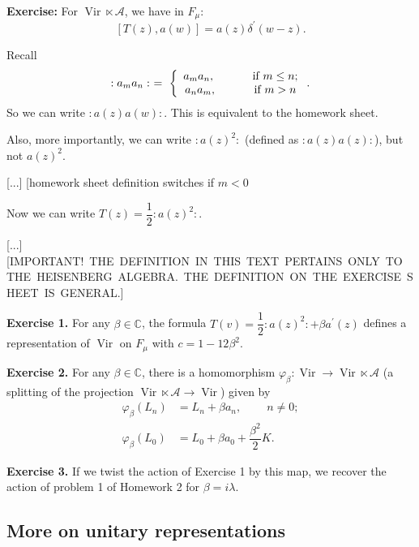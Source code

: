 \documentclass
[numbers=enddot,12pt,final,onecolumn,german,notitlepage]{scrartcl}%
\theoremstyle{definition}
\begin{document}
\textbf{Exercise:} For $\operatorname*{Vir}\ltimes\mathcal{A}$, we have in
$F_{\mu}$:%
\[
\left[  T\left(  z\right)  ,a\left(  w\right)  \right]  =a\left(  z\right)
\delta^{\prime}\left(  w-z\right)  .
\]


Recall%
\[
:a_{m}a_{n}:\ =\ \left\{
\begin{array}
[c]{c}%
a_{m}a_{n},\ \ \ \ \ \ \ \ \ \ \text{if }m\leq n;\\
a_{n}a_{m},\ \ \ \ \ \ \ \ \ \ \text{if }m>n
\end{array}
\right.  .
\]
So we can write $:a\left(  z\right)  a\left(  w\right)  :$. This is equivalent
to the homework sheet.

Also, more importantly, we can write $:a\left(  z\right)  ^{2}:$ (defined as
$:a\left(  z\right)  a\left(  z\right)  :$), but not $a\left(  z\right)  ^{2}$.

[...] [homework sheet definition switches if $m<0$

Now we can write $T\left(  z\right)  =\dfrac{1}{2}:a\left(  z\right)  ^{2}:$.

[...] [IMPORTANT!\ THE\ DEFINITION\ IN\ THIS\ TEXT\ PERTAINS\ ONLY\ TO\ THE\ HEISENBERG\ ALGEBRA.\ THE\ DEFINITION\ ON\ THE\ EXERCISE\ SHEET\ IS\ GENERAL.]

\textbf{Exercise 1.} For any $\beta\in\mathbb{C}$, the formula $T\left(
v\right)  =\dfrac{1}{2}:a\left(  z\right)  ^{2}:+\beta a^{\prime}\left(
z\right)  $ defines a representation of $\operatorname*{Vir}$ on $F_{\mu}$
with $c=1-12\beta^{2}$.

\textbf{Exercise 2.} For any $\beta\in\mathbb{C}$, there is a homomorphism
$\varphi_{\beta}:\operatorname*{Vir}\rightarrow\operatorname*{Vir}%
\ltimes\mathcal{A}$ (a splitting of the projection $\operatorname*{Vir}%
\ltimes\mathcal{A}\rightarrow\operatorname*{Vir}$) given by%
\begin{align*}
\varphi_{\beta}\left(  L_{n}\right)   &  =L_{n}+\beta a_{n}%
,\ \ \ \ \ \ \ \ \ \ n\neq0;\\
\varphi_{\beta}\left(  L_{0}\right)   &  =L_{0}+\beta a_{0}+\dfrac{\beta^{2}%
}{2}K.
\end{align*}


\textbf{Exercise 3.} If we twist the action of Exercise 1 by this map, we
recover the action of problem 1 of Homework 2 for $\beta=i\lambda$.

\subsection{More on unitary representations}
\end{document}
